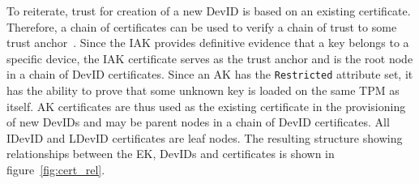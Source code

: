 \documentclass[runningheads]{llncs}
\begin{document}
To reiterate, trust for creation of a new DevID is based on an existing 
certificate. Therefore, a chain of certificates can be used to verify 
a chain of trust to some trust anchor~\citep{DevIDSpec-TCG}.
Since the IAK provides definitive evidence that a key belongs to a 
specific device, the IAK certificate serves as the trust anchor 
and is the root node in a chain of DevID certificates. Since an AK has 
the \verb|Restricted| attribute set, it has the ability to prove that 
some unknown key is loaded on the same TPM as itself.  AK certificates 
are thus used as the existing certificate in the provisioning of new DevIDs
and may be parent nodes in a chain of DevID certificates. 
All IDevID and LDevID certificates are leaf nodes.
The resulting structure showing relationships between the EK, DevIDs 
and certificates is shown in figure~\ref{fig:cert_rel}.


\end{document}
